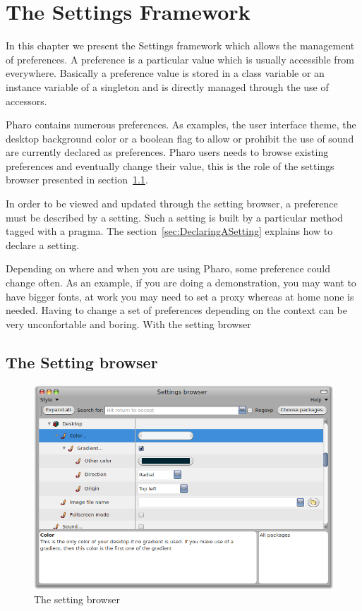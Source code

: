 \documentclass[a4paper,10pt,twoside]{book}
\begin{document}
\fi
\sloppy
\chapter{The Settings Framework}
In this chapter we present the Settings framework which allows the management of preferences. A preference is a particular value which is usually accessible from everywhere. Basically a preference value is stored in a class variable or an instance variable of a singleton and is directly managed through the use of accessors.

Pharo contains numerous preferences. As examples, the user interface theme, the desktop background color or a boolean flag to allow or prohibit the use of sound are currently declared as preferences. Pharo users needs to browse existing preferences and eventually change their value, this is the role of the settings browser presented in section~\ref{sec:TheSettingBrowser}. 

In order to be viewed and updated through the setting browser, a preference must be described by a setting. Such a setting is built by a particular method tagged with a pragma. The section~\ref{sec:DeclaringASetting} explains how to declare a setting.

Depending on where and when you are using Pharo, some preference could change often. As an example, if you are doing a demonstration, you may want to have bigger fonts, at work you may need to set a proxy whereas at home none is needed. Having to change a set of preferences depending on the context can be very unconfortable and boring. With the setting browser  

\section{The Setting browser}
\label{sec:TheSettingBrowser}

\begin{figure}[tbh]
\begin{center}
\includegraphics[width=\textwidth]{SettingBrowser.png}
\caption{The setting browser}
\end{center}
\end{figure}
\end{document}
